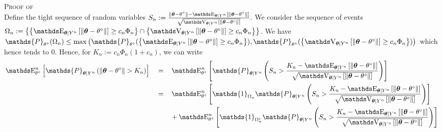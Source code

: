 \begin{pro}\label{pro2.6}{\textsc{Proof of }\\}
Define the tight sequence of random variables $S_{n} := \frac{\Vert \boldsymbol{\theta} - \theta^{\circ} \Vert - \E_{\boldsymbol{\theta} \vert Y^{n}}\left[\Vert \boldsymbol{\theta} - \theta^{\circ} \Vert\right]}{\sqrt{\V_{\boldsymbol{\theta} \vert Y^{n}}\left[\Vert \boldsymbol{\theta} - \theta^{\circ} \Vert\right]}}$.
We consider the sequence of events $\Omega_{n} := \left\{\left\{\E_{\boldsymbol{\theta} \vert Y^{n}}\left[\Vert \boldsymbol{\theta} - \theta^{\circ} \Vert\right] \geq c_{n} \Phi_{n}\right\} \cap \left\{\V_{\boldsymbol{\theta} \vert Y^{n}}\left[\Vert \boldsymbol{\theta} - \theta^{\circ} \Vert\right] \geq c_{n} \Phi_{n}\right\}\right\}$.
We have $\mathds{P}_{\theta^{\circ}}(\Omega_{n}) \leq \max\left(\mathds{P}_{\theta^{\circ}}(\left\{\E_{\boldsymbol{\theta} \vert Y^{n}}\left[\Vert \boldsymbol{\theta} - \theta^{\circ} \Vert\right] \geq c_{n} \Phi_{n}\right\}), \mathds{P}_{\theta^{\circ}}(\left\{\V_{\boldsymbol{\theta} \vert Y^{n}}\left[\Vert \boldsymbol{\theta} - \theta^{\circ} \Vert\right] \geq c_{n} \Phi_{n}\right\})\right)$ which hence tends to $0$.
Hence, for $K_{n} := c_{n} \Phi_{n} (1 + c_{n})$, we can write
\begin{alignat*}{3}
& \E_{\theta^{\circ}}^{n}\left[\mathds{P}_{\boldsymbol{\theta} \vert Y^{n}}\left(\Vert \boldsymbol{\theta} - \theta^{\circ} \Vert > K_{n} \right)\right] && = && \E_{\theta^{\circ}}^{n}\left[\mathds{P}_{\boldsymbol{\theta} \vert Y^{n}}\left(S_{n} > \frac{K_{n} - \E_{\boldsymbol{\theta} \vert Y^{n}}\left[\Vert \boldsymbol{\theta} - \theta^{\circ} \Vert\right]}{\sqrt{\V_{\boldsymbol{\theta} \vert Y^{n}}\left[\Vert \boldsymbol{\theta} - \theta^{\circ} \Vert\right]}} \right)\right]\\
& && = && \E_{\theta^{\circ}}^{n}\left[\mathds{1}_{\Omega_{n}}\mathds{P}_{\boldsymbol{\theta} \vert Y^{n}}\left(S_{n} > \frac{K_{n} - \E_{\boldsymbol{\theta} \vert Y^{n}}\left[\Vert \boldsymbol{\theta} - \theta^{\circ} \Vert\right]}{\sqrt{\V_{\boldsymbol{\theta} \vert Y^{n}}\left[\Vert \boldsymbol{\theta} - \theta^{\circ} \Vert\right]}} \right)\right]\\
& && && + \E_{\theta^{\circ}}^{n}\left[\mathds{1}_{\Omega_{n}^{c}}\mathds{P}_{\boldsymbol{\theta} \vert Y^{n}}\left(S_{n} > \frac{K_{n} - \E_{\boldsymbol{\theta} \vert Y^{n}}\left[\Vert \boldsymbol{\theta} - \theta^{\circ} \Vert\right]}{\sqrt{\V_{\boldsymbol{\theta} \vert Y^{n}}\left[\Vert \boldsymbol{\theta} - \theta^{\circ} \Vert\right]}} \right)\right]\\

\end{alignat*}
\end{pro}
